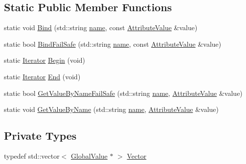 \subsection*{Static Public Member Functions}
\begin{DoxyCompactItemize}
\item 
static void \hyperlink{classns3_1_1GlobalValue_a4fe56773b98d1047cd50e974256fd14a}{Bind} (std\+::string \hyperlink{generate__test__data__lte__spectrum__model_8m_ab74e6bf80237ddc4109968cedc58c151}{name}, const \hyperlink{classns3_1_1AttributeValue}{Attribute\+Value} \&value)
\item 
static bool \hyperlink{classns3_1_1GlobalValue_acda63956e7f662d674b8e3be79783e64}{Bind\+Fail\+Safe} (std\+::string \hyperlink{generate__test__data__lte__spectrum__model_8m_ab74e6bf80237ddc4109968cedc58c151}{name}, const \hyperlink{classns3_1_1AttributeValue}{Attribute\+Value} \&value)
\item 
static \hyperlink{classns3_1_1GlobalValue_a1bb2cbb186e3759817095c9a5f5f544e}{Iterator} \hyperlink{classns3_1_1GlobalValue_acdeb71b28fe45d98523a2168e8807d83}{Begin} (void)
\item 
static \hyperlink{classns3_1_1GlobalValue_a1bb2cbb186e3759817095c9a5f5f544e}{Iterator} \hyperlink{classns3_1_1GlobalValue_a2488c329999cf507cc7f7aeb173a4a75}{End} (void)
\item 
static bool \hyperlink{classns3_1_1GlobalValue_a5ca71172f85db4c2f8c4357e637bb758}{Get\+Value\+By\+Name\+Fail\+Safe} (std\+::string \hyperlink{generate__test__data__lte__spectrum__model_8m_ab74e6bf80237ddc4109968cedc58c151}{name}, \hyperlink{classns3_1_1AttributeValue}{Attribute\+Value} \&value)
\item 
static void \hyperlink{classns3_1_1GlobalValue_ac9c1b564b0b06dc07765194c9bc4bd29}{Get\+Value\+By\+Name} (std\+::string \hyperlink{generate__test__data__lte__spectrum__model_8m_ab74e6bf80237ddc4109968cedc58c151}{name}, \hyperlink{classns3_1_1AttributeValue}{Attribute\+Value} \&value)
\end{DoxyCompactItemize}
\subsection*{Private Types}
\begin{DoxyCompactItemize}
\item 
typedef std\+::vector$<$ \hyperlink{classns3_1_1GlobalValue}{Global\+Value} $\ast$ $>$ \hyperlink{classns3_1_1GlobalValue_a674b6c1d387dc3b62e416c7fff43a4e9}{Vector}
\end{DoxyCompactItemize}

